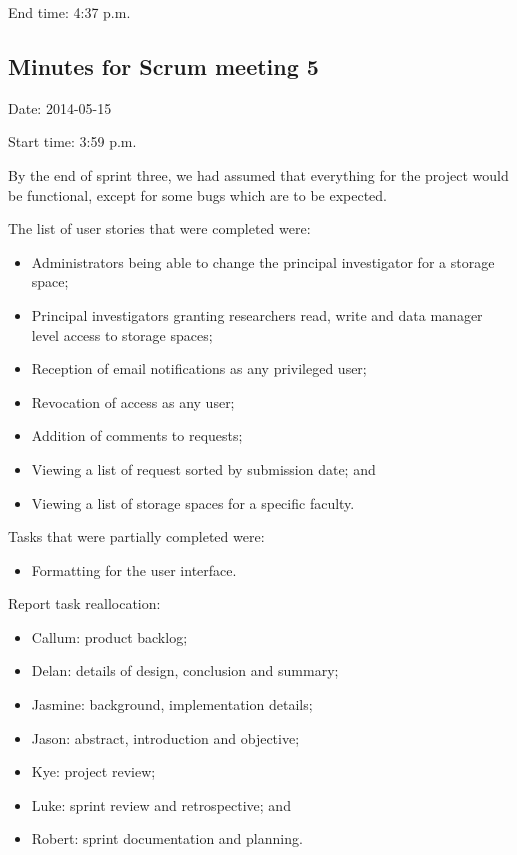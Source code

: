\documentclass[a4paper,titlepage,12pt]{article}
\begin{document}
End time: 4:37 p.m.

\subsection{Minutes for Scrum meeting 5}

Date: 2014-05-15

Start time: 3:59 p.m.

By the end of sprint three, we had assumed that everything for the project
would be functional, except for some bugs which are to be expected.

The list of user stories that were completed were:

\begin{itemize}
	\item Administrators being able to change the principal investigator
	      for a storage space;
	\item Principal investigators granting researchers read, write and data
	      manager level access to storage spaces;
	\item Reception of email notifications as any privileged user;
	\item Revocation of access as any user;
	\item Addition of comments to requests;
	\item Viewing a list of request sorted by submission date; and
	\item Viewing a list of storage spaces for a specific faculty.
\end{itemize}

Tasks that were partially completed were:

\begin{itemize}
	\item Formatting for the user interface.
\end{itemize}

Report task reallocation:

\begin{itemize}
	\item Callum: product backlog;
	\item Delan: details of design, conclusion and summary;
	\item Jasmine: background, implementation details;
	\item Jason: abstract, introduction and objective;
	\item Kye: project review;
	\item Luke: sprint review and retrospective; and
	\item Robert: sprint documentation and planning.
\end{itemize}
\end{document}
